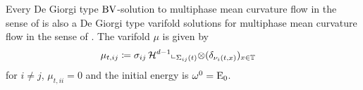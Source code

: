 \begin{theorem}
	\label{bv_solutions_are_varifold_solutions}
	Every  De Giorgi type $ \operatorname{BV} $-solution to multiphase mean curvature 
	flow in the sense of  is also a De Giorgi 
	type varifold solutions for multiphase mean curvature flow in the sense of
	.
	The varifold $ \mu $ is given by
	\begin{align*}
		\mu_{ t, ij  }
		& \coloneqq
		\sigma_{ i j }
		\operatorname{\mathcal{H}}^{ d- 1 }\llcorner_{ \Sigma_{ i j } ( t ) }
		\otimes
		( \delta_{ \nu_{ i } ( t, x ) } )_{ x \in \operatorname{\mathbb{T}} }
	\end{align*} 
	for $ i \neq j $, $
	\mu_{ t , i i } = 0 $ and the initial energy is $ \omega^{ 0 } 
	= \operatorname{E}_{ 0 } $.
\end{theorem}

